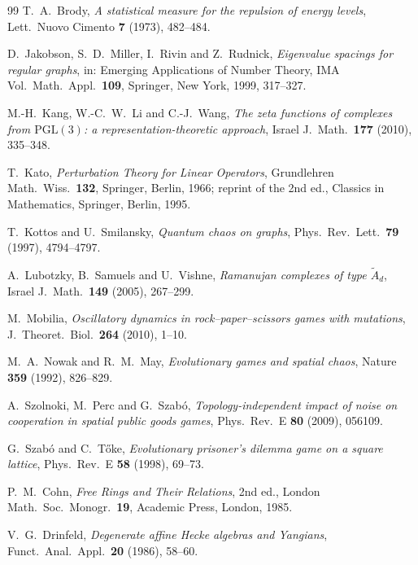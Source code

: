 \begin{thebibliography}{99}
 T.~A.~Brody, \emph{A statistical measure for the repulsion of energy levels}, Lett.\ Nuovo Cimento \textbf{7} (1973), 482--484. 

 D.~Jakobson, S.~D.~Miller, I.~Rivin and Z.~Rudnick, \emph{Eigenvalue spacings for regular graphs}, in: Emerging Applications of Number Theory, IMA Vol.\ Math.\ Appl.\ \textbf{109}, Springer, New York, 1999, 317--327. 

 M.-H.~Kang, W.-C.~W.~Li and C.-J.~Wang, \emph{The zeta functions of complexes from $\mathrm{PGL}(3)$: a representation-theoretic approach}, Israel J.\ Math.\ \textbf{177} (2010), 335--348. 

 T.~Kato, \emph{Perturbation Theory for Linear Operators}, Grundlehren Math.\ Wiss.\ \textbf{132}, Springer, Berlin, 1966; reprint of the 2nd ed., Classics in Mathematics, Springer, Berlin, 1995. 

 T.~Kottos and U.~Smilansky, \emph{Quantum chaos on graphs}, Phys.\ Rev.\ Lett.\ \textbf{79} (1997), 4794--4797. 

 A.~Lubotzky, B.~Samuels and U.~Vishne, \emph{Ramanujan complexes of type $\tilde A_d$}, Israel J.\ Math.\ \textbf{149} (2005), 267--299. 

 M.~Mobilia, \emph{Oscillatory dynamics in rock--paper--scissors games with mutations}, J.\ Theoret.\ Biol.\ \textbf{264} (2010), 1--10. 

 M.~A.~Nowak and R.~M.~May, \emph{Evolutionary games and spatial chaos}, Nature \textbf{359} (1992), 826--829. 

 A.~Szolnoki, M.~Perc and G.~Szab\'o, \emph{Topology-independent impact of noise on cooperation in spatial public goods games}, Phys.\ Rev.\ E \textbf{80} (2009), 056109. 

 G.~Szab\'o and C.~T\H{o}ke, \emph{Evolutionary prisoner's dilemma game on a square lattice}, Phys.\ Rev.\ E \textbf{58} (1998), 69--73. 

 P.~M.~Cohn, \emph{Free Rings and Their Relations}, 2nd ed., London Math.\ Soc.\ Monogr.\ \textbf{19}, Academic Press, London, 1985.

 V.~G.~Drinfeld, \emph{Degenerate affine Hecke algebras and Yangians}, Funct.\ Anal.\ Appl.\ \textbf{20} (1986), 58--60. 


\end{thebibliography}
